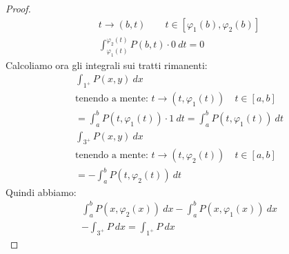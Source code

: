 \documentclass[a4paper, oneside]{article}
\begin{document}
\begin{proof}
\begin{gather*}
  t \to (b,t) \qquad t \in [\varphi_1(b), \varphi_2(b)] \\
  \int_{\varphi_1(t)}^{\varphi_2(t)} P(b,t) \cdot 0 \ dt = 0
\end{gather*}
Calcoliamo ora gli integrali sui tratti rimanenti:
\begin{gather*}
  \int_{\boxed{1}^+} P(x,y) \ dx \\
  \text{tenendo a mente: } t \to (t, \varphi_1(t)) \quad t \in [a,b]\\
  = \int_a^b P(t,\varphi_1(t)) \cdot 1 \ dt = \int_a^b P(t,\varphi_1(t)) \ dt \\
  \int_{\boxed{3}^+} P(x,y) \ dx \\
  \text{tenendo a mente: } t \to (t, \varphi_2(t)) \quad t \in [a,b]\\  
  = -\int_a^b P(t,\varphi_2(t)) \ dt
\end{gather*}
Quindi abbiamo:
\begin{gather*}
  \int_a^b P\left( x, \varphi_2(x) \right) \ dx - \int_a^b P\left( x, \varphi_1(x) \right) \ dx\\
  -\int_{\boxed{3}^+} P \ dx = \int_{\boxed{1}^+} P \ dx
\end{gather*}
\end{proof}
\end{document}
